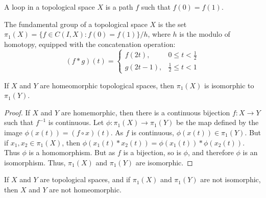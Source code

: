 \documentclass[crop=false,class=book,oneside]{standalone}
\begin{document}
            \begin{definition}
                    A loop in a topological space $X$ is a
                    path $f$ such that $f(0)=f(1)$.
                \end{definition}
            \begin{definition}
                The fundamental group of a topological space
                $X$ is the set
                $\pi_{1}(X)=\{f\in{C(I,X)}:f(0)=f(1)\}/h$,
                where $h$ is the modulo of homotopy,
                equipped with the concatenation operation:
                \begin{equation*}
                    (f*g)(t)=
                    \begin{cases}
                        f(2t),&0\leq{t}<\frac{1}{2}\\
                        g(2t-1),&\frac{1}{2}\leq{t}<1
                    \end{cases}
                \end{equation*}
            \end{definition}
            \begin{theorem}
                If $X$ and $Y$ are homeomorphic topological
                spaces, then $\pi_{1}(X)$ is isomorphic
                to $\pi_{1}(Y)$.
            \end{theorem}
            \begin{proof}
                If $X$ and $Y$ are homemorphic, then there is
                a continuous bijection
                $f:X\rightarrow{Y}$ such that $f^{-1}$ is
                continuous.
                Let $\phi:\pi_{1}(X)\rightarrow\pi_{1}(Y)$
                be the map defined by the image
                $\phi(x(t))=(f\circ{x})(t)$. As $f$ is
                continuous, $\phi(x(t))\in\pi_{1}(Y)$.
                But if $x_{1},x_{2}\in\pi_{1}(X)$, then
                $\phi(x_{1}(t)*x_{2}(t))%
                 =\phi(x_{1}(t))*\phi(x_{2}(t))$. Thus
                $\phi$ is a homomorphism. But as
                $f$ is a bijection, so is $\phi$, and
                therefore $\phi$ is an isomorphism.
                Thus, $\pi_{1}(X)$ and
                $\pi_{1}(Y)$ are isomorphic.
            \end{proof}
            \begin{theorem}
                If $X$ and $Y$ are topological spaces,
                and if $\pi_{1}(X)$ and $\pi_{1}(Y)$
                are not isomorphic, then
                $X$ and $Y$ are not homeomorphic.
            \end{theorem}
\end{document}

